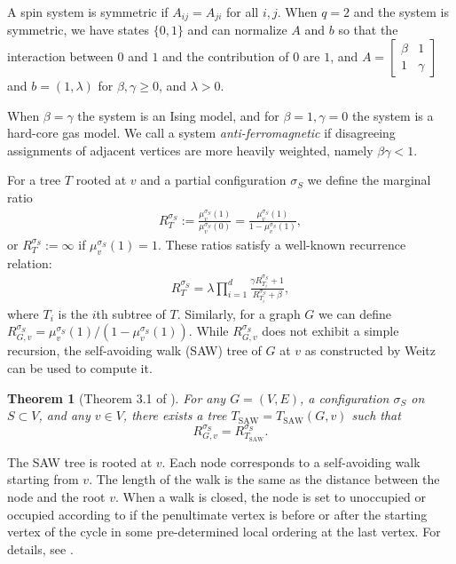\documentclass[11pt]{amsart}
\newcommand{\defeq}{:=}
\newtheorem{theorem}{Theorem}
\theoremstyle{definition}
\theoremstyle{remark}
\newcommand{\TSAW}{T_{\mathrm{SAW}}}
\begin{document}
A spin system is symmetric if $A_{ij}=A_{ji}$ for all $i,j$. %
When $q=2$ and the system is symmetric, we have states $\{0,1\}$ and can normalize $A$ and $b$ so that the interaction between $0$ and $1$ and the contribution of $0$ are $1$, and $A=
\begin{bmatrix}
\beta & 1\\
1 & \gamma
\end{bmatrix}$ and $b=(1,\lambda)$ for $\beta,\gamma\geq0$, and $\lambda>0$. 

When $\beta=\gamma$ the system is an Ising model, and for $\beta=1, \gamma=0$ the system is a hard-core gas model. We call a system \emph{anti-ferromagnetic} if disagreeing assignments of adjacent vertices are more heavily weighted, namely $\beta\gamma<1$. 

For a tree $T$ rooted at $v$ and a partial configuration $\sigma_S$ we define the marginal ratio
\begin{align*}
  R_T^{\sigma_S}\defeq\frac{\mu_v^{\sigma_S}(1)}{\mu_v^{\sigma_S}(0)}=\frac{\mu_v^{\sigma_S}(1)}{1-\mu_v^{\sigma_S}(1)},
\end{align*}
or $R_T^{\sigma_S}\defeq\infty$ if $\mu_v^{\sigma_S}(1)=1$.
These ratios satisfy a well-known recurrence relation:
\begin{align}
\label{saw-recursion}
R_T^{\sigma_S}=\lambda\prod_{i=1}^d\frac{\gamma R_{T_i}^{\sigma_S}+1}{R_{T_i}^{\sigma_S}+\beta},
\end{align}
where $T_i$ is the $i$th subtree of $T$. Similarly, for a graph $G$ we can define $R_{G,v}^{\sigma_S}=\mu_v^{\sigma_S}(1)/(1-\mu_v^{\sigma_S}(1))$.
While $R_{G,v}^{\sigma_S}$ does not exhibit a simple recursion, the self-avoiding walk (SAW) tree of $G$ at $v$ as constructed by Weitz \cite{Wei06} can be used to compute it. 

\begin{theorem}[Theorem 3.1 of \cite{Wei06}]
\label{saw-theorem}
For any $G=(V,E)$, a configuration $\sigma_S$ on $S\subset V$, and any $v\in V$, there exists a tree $\TSAW=\TSAW(G,v)$ such that
\[R_{G,v}^{\sigma_S}=R_{\TSAW}^{\sigma_S}.\]
\end{theorem}

The SAW tree is rooted at $v$.
Each node corresponds to a self-avoiding walk starting from $v$. The length of the walk is the same as the distance between the node and the root $v$.
When a walk is closed, the node is set to unoccupied or occupied according to if the penultimate vertex is before or after the starting vertex of the cycle in some pre-determined local ordering at the last vertex.
For details, see \cite{Wei06}.
\end{document}
